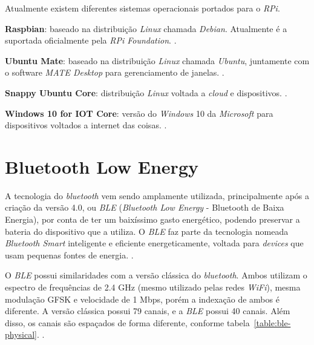 Atualmente existem diferentes sistemas operacionais portados para o \textit{RPi}.

\begin{alineas}
	\item \textbf{Raspbian}: baseado na distribuição \textit{Linux} chamada \textit{Debian}. Atualmente é a suportada oficialmente pela \textit{RPi Foundation}. \cite{rpi-download}.
	\item \textbf{Ubuntu Mate}: baseado na distribuição \textit{Linux} chamada \textit{Ubuntu}, juntamente com o software \textit{MATE Desktop} para gerenciamento de janelas. \cite{ubuntu-mate}.
	\item \textbf{Snappy Ubuntu Core}: distribuição \textit{Linux} voltada a \textit{cloud} e dispositivos. \cite{snappy-ubuntu}.
	\item \textbf{Windows 10 for IOT Core}: versão do \textit{Windows} 10 da \textit{Microsoft} para dispositivos voltados a internet das coisas. \cite{windows10-iot}.
\end{alineas}

\section{Bluetooth Low Energy}\label{sec:ble}

A tecnologia do \textit{bluetooth} vem sendo amplamente utilizada, principalmente após a criação da versão 4.0, ou \textit{BLE} (\textit{Bluetooth Low Energy} - Bluetooth de Baixa Energia), por conta de ter um baixíssimo gasto energético, podendo preservar a bateria do dispositivo que a utiliza. O \textit{BLE} faz parte da tecnologia nomeada \textit{Bluetooth Smart} inteligente e eficiente energeticamente, voltada para \textit{devices} que usam pequenas fontes de energia. \cite{bluetooth-smart}.

O \textit{BLE} possui similaridades com a versão clássica do \textit{bluetooth}. Ambos utilizam o espectro de frequências de 2.4 GHz (mesmo utilizado pelas redes \textit{WiFi}), mesma modulação GFSK e velocidade de 1 Mbps, porém a indexação de ambos é diferente. A versão clássica possui 79 canais, e a \textit{BLE} possui 40 canais. Além disso, os canais são espaçados de forma diferente, conforme tabela~\ref{table:ble-physical}. \cite{ble-packets}.

\begin{table}[htb]
\end{table}

